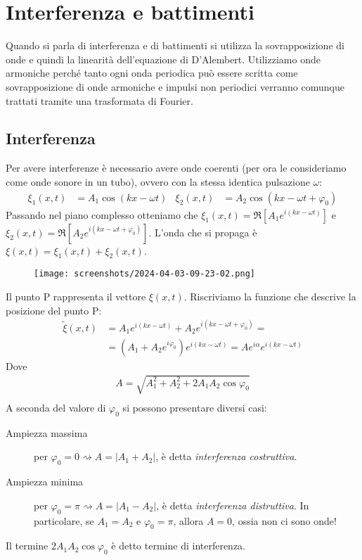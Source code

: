 \section{Interferenza e battimenti}

Quando si parla di interferenza e di battimenti si utilizza la sovrapposizione di onde e quindi la linearità dell'equazione di D'Alembert. Utilizziamo onde armoniche perché tanto ogni onda periodica può essere scritta come sovrapposizione di onde armoniche e impulsi non periodici verranno comunque trattati tramite una trasformata di Fourier.

\subsection{Interferenza}
Per avere interferenze è necessario avere onde coerenti (per ora le consideriamo come onde sonore in un tubo), ovvero con la stessa identica pulsazione \(\omega \):
\begin{align}
	\xi _1 (x,t) &= A_1 \cos (kx - \omega t) & \xi _2 (x,t) &= A_2 \cos (kx - \omega t + \varphi_0 )
\end{align}
Passando nel piano complesso otteniamo che \(\xi _1 (x,t) = \Re [A_1 e^{i(kx- \omega t)}]\) e \(\xi _2 (x,t) = \Re [A_2 e^{i(kx- \omega t + \varphi _0)}]\). L'onda che si propaga è \(\xi (x,t)= \xi _1(x,t) + \xi _2 (x,t)\).
\begin{figure}[H]
	\centering
	\texttt{[image: screenshots/2024-04-03-09-23-02.png]}
\end{figure}
Il punto P rappresenta il vettore \(\xi (x,t)\). Riscriviamo la funzione che descrive la posizione del punto P:
\begin{align}
	\widetilde{\xi } (x,t) &= A_1 e^{i(kx - \omega t)} + A_2 e^{i(kx - \omega t + \varphi _0)} =\\
	&=(A_1 + A_2 e^{i \varphi _0}) e^{i(kx - \omega t)} = A e^{i \alpha } e^{i(kx - \omega t)}
\end{align}
Dove
\begin{gather}
	A  = \sqrt{A_1^2 + A_2^2 + 2A_1 A_2 \cos \varphi _0 }\\ 
\end{gather}
A seconda del valore di \(\varphi _0\) si possono presentare diversi casi:
\begin{description}
	\item[Ampiezza massima] per \(\varphi _0 = 0 \rightsquigarrow A = \vert A_1 + A_2 \vert \), è detta \emph{interferenza costruttiva}.
	\item[Ampiezza minima] per \(\varphi _0 = \pi \rightsquigarrow A = \vert A_1 - A_2 \vert \), è detta \emph{interferenza distruttiva}. In particolare, se \(A_1 = A_2\) e \(\varphi _0 = \pi \), allora \(A = 0\), ossia non ci sono onde!
\end{description}
Il termine \(2 A_1 A_2 \cos \varphi _0\) è detto termine di interferenza.
